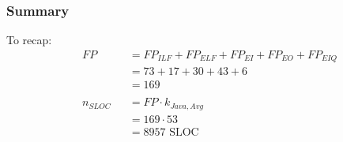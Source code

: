 \subsubsection{Summary}
To recap:
\begin{equation*}
	\begin{aligned}
		&	FP
		& & = FP_{ILF} + FP_{ELF} + FP_{EI} + FP_{EO} + FP_{EIQ}\\
		&&& = 73 + 17 + 30 + 43 + 6\\
		&&& = 169\\	
		\\
		&   n_{SLOC}
		& & = FP \cdot k_{Java, Avg}\\
		&&& = 169 \cdot 53\\
		&&& = 8957 \text{ SLOC}
	\end{aligned}
\end{equation*}

